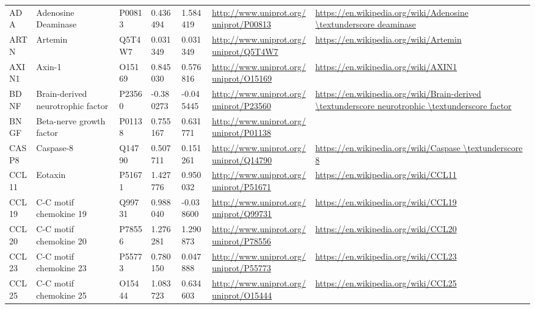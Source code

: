 \begin{table}[H]
{\begin{tabular}{ lllllll }
        \multicolumn{1}{l|}{ ADA } &  Adenosine Deaminase   & P00813   & 0.436494   & 1.584419   & \url{http://www.uniprot.org/uniprot/P00813}   & \url{https://en.wikipedia.org/wiki/Adenosine \textunderscore deaminase}          \\ 
        \multicolumn{1}{l|}{ ARTN } &  Artemin   & Q5T4W7   & 0.031349   & 0.031349   & \url{http://www.uniprot.org/uniprot/Q5T4W7}   & \url{https://en.wikipedia.org/wiki/Artemin}          \\ 
        \multicolumn{1}{l|}{ AXIN1 } &  Axin-1   & O15169   & 0.845030   & 0.576816   & \url{http://www.uniprot.org/uniprot/O15169}   & \url{https://en.wikipedia.org/wiki/AXIN1}          \\ 
        \multicolumn{1}{l|}{ BDNF } &  Brain-derived neurotrophic factor   & P23560   & -0.380273   & -0.045445   & \url{http://www.uniprot.org/uniprot/P23560}   & \url{https://en.wikipedia.org/wiki/Brain-derived \textunderscore neurotrophic \textunderscore factor}          \\ 
        \multicolumn{1}{l|}{ BNGF } &  Beta-nerve growth factor   & P01138   & 0.755167   & 0.631771   & \url{http://www.uniprot.org/uniprot/P01138}   &           \\ 
        \multicolumn{1}{l|}{ CASP8 } &  Caspase-8   & Q14790   & 0.507711   & 0.151261   & \url{http://www.uniprot.org/uniprot/Q14790}   & \url{https://en.wikipedia.org/wiki/Caspase \textunderscore 8}          \\ 
        \multicolumn{1}{l|}{ CCL11 } &  Eotaxin   & P51671   & 1.427776   & 0.950032   & \url{http://www.uniprot.org/uniprot/P51671}   & \url{https://en.wikipedia.org/wiki/CCL11}          \\ 
        \multicolumn{1}{l|}{ CCL19 } &  C-C motif chemokine 19   & Q99731   & 0.988040   & -0.038600   & \url{http://www.uniprot.org/uniprot/Q99731}   & \url{https://en.wikipedia.org/wiki/CCL19}          \\ 
        \multicolumn{1}{l|}{ CCL20 } &  C-C motif chemokine 20   & P78556   & 1.276281   & 1.290873   & \url{http://www.uniprot.org/uniprot/P78556}   & \url{https://en.wikipedia.org/wiki/CCL20}          \\ 
        \multicolumn{1}{l|}{ CCL23 } &  C-C motif chemokine 23   & P55773   & 0.780150   & 0.047888   & \url{http://www.uniprot.org/uniprot/P55773}   & \url{https://en.wikipedia.org/wiki/CCL23}          \\ 
        \multicolumn{1}{l|}{ CCL25 } &  C-C motif chemokine 25   & O15444   & 1.083723   & 0.634603   & \url{http://www.uniprot.org/uniprot/O15444}   & \url{https://en.wikipedia.org/wiki/CCL25}          \\ 

\end{tabular}}
\end{table}
